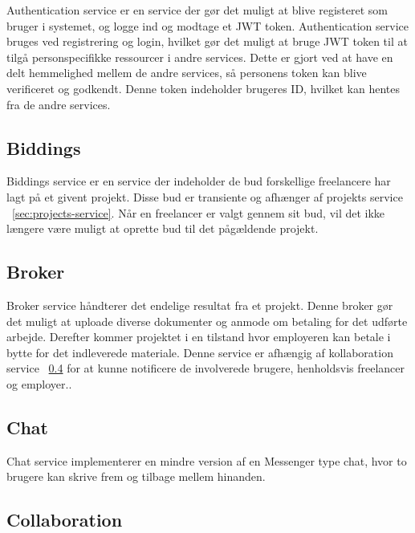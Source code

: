 Authentication service er en service der gør det muligt at blive registeret som bruger i systemet, og logge ind og modtage et JWT token. Authentication service bruges ved registrering og login, hvilket gør det muligt at bruge JWT token til at tilgå personspecifikke ressourcer i andre services. Dette er gjort ved at have en delt hemmelighed mellem de andre services, så personens token kan blive verificeret og godkendt. Denne token indeholder brugeres ID, hvilket kan hentes fra de andre services.

\subsection{Biddings}
\label{sec:biddings-service}

Biddings service er en service der indeholder de bud forskellige freelancere har lagt på et givent projekt. Disse bud er transiente og afhænger af projekts service ~\ref{sec:projects-service}. Når en freelancer er valgt gennem sit bud, vil det ikke længere være muligt at oprette bud til det pågældende projekt.


\subsection{Broker}
\label{sec:broker-service}

Broker service håndterer det endelige resultat fra et projekt. Denne broker gør det muligt at uploade diverse dokumenter og anmode om betaling for det udførte arbejde. Derefter kommer projektet i en tilstand hvor employeren kan betale i bytte for det indleverede materiale. Denne service er afhængig af kollaboration service ~\ref{sec:collaboration-service} for at kunne notificere de involverede brugere, henholdsvis freelancer og employer..

\subsection{Chat}
\label{sec:chat-service}

Chat service implementerer en mindre version af en Messenger type chat, hvor to brugere kan skrive frem og tilbage mellem hinanden.

\subsection{Collaboration}
\label{sec:collaboration-service}

